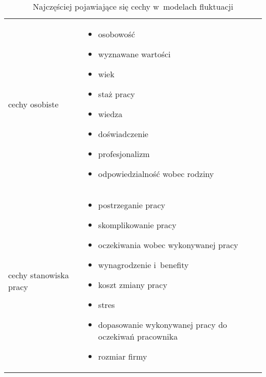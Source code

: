 \noindent\begin{minipage}{\textwidth}
             \begin{table}[H]
                 \raggedright\caption{Najczęściej pojawiające się cechy w~modelach fluktuacji\label{tabela:fluktuacja-cechy}}
                 \begin{center}
                     \begin{tabular}{|P{.2\textwidth}|P{.7\textwidth}|}

                         \hline
                          &
                          \\
                         \hline

                         cechy osobiste &
                         \begin{itemize}
                             \item osobowość
                             \item wyznawane wartości
                             \item wiek
                             \item staż pracy
                             \item wiedza
                             \item doświadczenie
                             \item profesjonalizm
                             \item odpowiedzialność wobec rodziny
                         \end{itemize} \\

                         \hline

                         cechy stanowiska pracy &
                         \begin{itemize}
                             \item postrzeganie pracy
                             \item skomplikowanie pracy
                             \item oczekiwania wobec wykonywanej pracy
                             \item wynagrodzenie i~benefity
                             \item koszt zmiany pracy
                             \item stres
                             \item dopasowanie wykonywanej pracy do oczekiwań pracownika
                             \item rozmiar firmy
                         \end{itemize} \\
                         \hline


\end{tabular}
\end{center}
\end{table}
\end{minipage}
